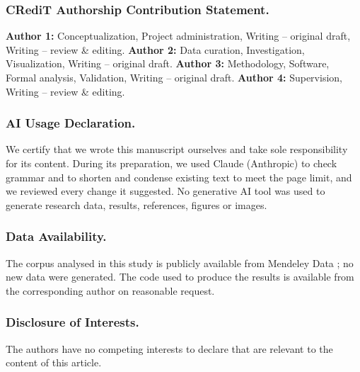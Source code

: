 \documentclass[runningheads]{llncs}
\begin{document}
\subsubsection{CRediT Authorship Contribution Statement.}
\textbf{Author 1:} Conceptualization, Project administration, Writing -- original draft, Writing -- review \& editing.
\textbf{Author 2:} Data curation, Investigation, Visualization, Writing -- original draft.
\textbf{Author 3:} Methodology, Software, Formal analysis, Validation, Writing -- original draft.
\textbf{Author 4:} Supervision, Writing -- review \& editing.

\subsubsection{AI Usage Declaration.}
We certify that we wrote this manuscript ourselves and take sole responsibility
for its content. During its preparation, we used Claude (Anthropic) to check grammar
and to shorten and condense existing text to meet the page limit, and we
reviewed every change it suggested. No generative AI tool was
used to generate research data, results, references, figures or images.

\subsubsection{Data Availability.}
The corpus analysed in this study is publicly available from Mendeley Data \cite{Rahutomo2018}; no new data were generated. The code used to produce the results is available from the corresponding author on reasonable request.

\subsubsection{Disclosure of Interests.} The authors have no competing interests to declare that are relevant to the content of this article.



\end{document}
